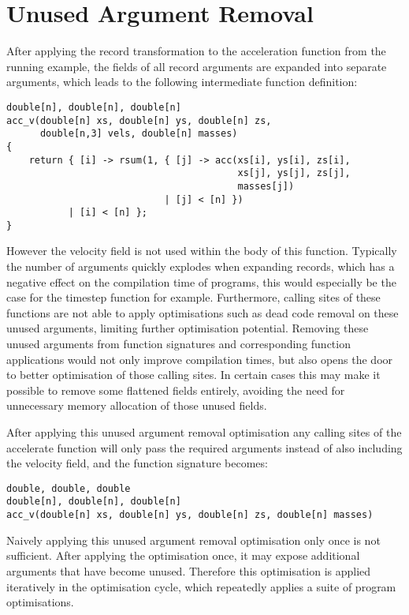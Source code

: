 
\section{Unused Argument Removal}\label{sec:uar}

After applying the record transformation to the acceleration function from the running example, the fields of all record arguments are expanded into separate arguments, which leads to the following intermediate function definition:
%
\begin{lstlisting}
double[n], double[n], double[n]
acc_v(double[n] xs, double[n] ys, double[n] zs,
      double[n,3] vels, double[n] masses)
{
    return { [i] -> rsum(1, { [j] -> acc(xs[i], ys[i], zs[i],
                                         xs[j], ys[j], zs[j],
                                         masses[j])
                            | [j] < [n] })
           | [i] < [n] };
}
\end{lstlisting}
%
However the velocity field is not used within the body of this function.
Typically the number of arguments quickly explodes when expanding records, which has a negative effect on the compilation time of programs, this would especially be the case for the timestep function for example.
Furthermore, calling sites of these functions are not able to apply optimisations such as dead code removal on these unused arguments, limiting further optimisation potential.
Removing these unused arguments from function signatures and corresponding function applications would not only improve compilation times, but also opens the door to better optimisation of those calling sites.
In certain cases this may make it possible to remove some flattened fields entirely, avoiding the need for unnecessary memory allocation of those unused fields.

After applying this unused argument removal optimisation any calling sites of the accelerate function will only pass the required arguments instead of also including the velocity field, and the function signature becomes:
%
\begin{lstlisting}
double, double, double
double[n], double[n], double[n]
acc_v(double[n] xs, double[n] ys, double[n] zs, double[n] masses)
\end{lstlisting}
%
Naively applying this unused argument removal optimisation only once is not sufficient.
After applying the optimisation once, it may expose additional arguments that have become unused.
Therefore this optimisation is applied iteratively in the optimisation cycle, which repeatedly applies a suite of program optimisations.
